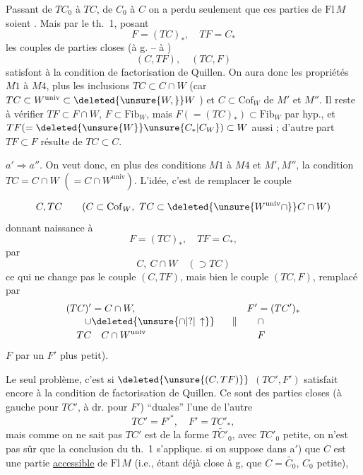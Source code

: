 Passant de $TC_0$ à $TC$, de $C_0$ à $C$
on a perdu seulement que ces parties de
$\mathrm{Fl}\,M$ soient . Mais par le th.~1, posant
\[
 F=(TC)_*,\quad TF=C_*
\]
les  couples de parties closes (à g. -- à )
\[
 (C,TF),\quad (TC,F)
\]
satisfont à la condition de factorisation de
Quillen. On aura donc les propriétés
$M1$ à $M4$, plus les inclusions
$TC\subset C\cap W$ \unsure{,} (car $TC\subset W^{\mathrm{univ}}\subset\deleted{\unsure{W,}}W$ ) et
$C\subset\mathrm{Cof}_W$ de $M'$ et $M''$. Il reste à vérifier
$TF\subset F\cap W$, $F\subset\mathrm{Fib}_W$, mais $F(=(TC)_*)\subset\mathrm{Fib}_W$ par hyp., et $TF(=\deleted{\unsure{W}}\unsure{C_*|C_W})\subset W$
aussi ; d'autre part $TF\subset F$ résulte
de $TC\subset C$.

$a'\Rightarrow a''$. On veut donc, en plus
des conditions $M1$ à $M4$ et $M',M''$, la
condition $TC=C\cap W$ $(=C\cap W^{\mathrm{univ}})$.
L'idée, c'est de remplacer le couple

\[
 C,TC\qquad(C\subset\mathrm{Cof}_W,\ TC\subset\deleted{\unsure{W^{\mathrm{univ}}\cap}}C\cap W)
\]
donnant naissance à
\[
 F=(TC)_*,\quad TF=C_*,
\]
par
\[
 C,\ C\cap W\quad(\supset TC)
\]
ce qui ne change pas le couple $(C,TF)$,
mais bien le couple $(TC,F)$, remplacé
par
\[
 \begin{aligned}
 (TC)' &={} C\cap W,& F'&=(TC')_*\\[-2pt]
 \cup &\deleted{\unsure{\cap|?|\,\uparrow}}\hspace{1.5em}\parallel &&\cap\\[-2pt]
 TC &\quad C\cap W^{\mathrm{univ}}&&F
 \end{aligned}
\]
\unsure{--}  $F$ par un $F'$ plus petit).

Le seul problème, c'est si $\deleted{\unsure{(C,TF)}}$
$(TC',F')$ satisfait encore à la condition
de factorisation de Quillen. Ce sont des
parties closes (à gauche pour $TC'$, à dr.
pour $F'$) ``duales'' l'une de l'autre
\[
 TC'={F'}^{*},\quad F'=TC'_*,
\]
mais comme on ne sait pas 
$TC'$ est  de la forme $\widetilde{TC'_0}$, avec
$TC'_0$ petite, on n'est pas sûr que la 
conclusion du th.~1 s'applique.  
si on suppose dans a$'$) que $C$ est
une partie \uline{accessible} de $\mathrm{Fl}\,M$ (i.e., étant
déjà close à g, que $C=\widetilde{C_0}$, $C_0$ petite),

